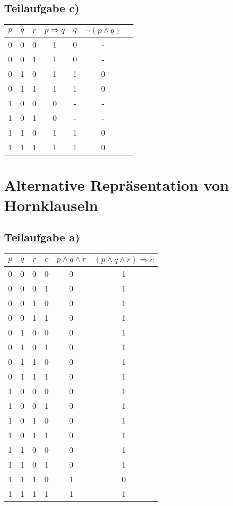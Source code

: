 \documentclass{article}
\begin{document}
\subsection{Teilaufgabe c)}

\begin{tabular}{|c|c|c|c|c|c|c|}
\hline
$p$ & $q$ & $r$ & $p \Rightarrow q$ & $q$ & $\neg (p \wedge q)$\\
\hline
0 & 0 & 0 & 1 & 0 & - \\
0 & 0 & 1 & 1 & 0 & - \\
0 & 1 & 0 & 1 & 1 & 0 \\
0 & 1 & 1 & 1 & 1 & 0 \\
1 & 0 & 0 & 0 & - & - \\
1 & 0 & 1 & 0 & - & - \\
1 & 1 & 0 & 1 & 1 & 0 \\
1 & 1 & 1 & 1 & 1 & 0 \\
\hline
\end{tabular}

\section{Alternative Repräsentation von Hornklauseln}

\subsection{Teilaufgabe a)}

\begin{tabular}{|c|c|c|c|c|c|}
\hline
$p$ & $q$ & $r$ & $c$ & $p \wedge q \wedge r$ & $(p \wedge q \wedge r) \Rightarrow c$\\
\hline
0 & 0 & 0 & 0 & 0 & 1\\
0 & 0 & 0 & 1 & 0 & 1\\
0 & 0 & 1 & 0 & 0 & 1\\
0 & 0 & 1 & 1 & 0 & 1\\
0 & 1 & 0 & 0 & 0 & 1\\
0 & 1 & 0 & 1 & 0 & 1\\
0 & 1 & 1 & 0 & 0 & 1\\
0 & 1 & 1 & 1 & 0 & 1\\
1 & 0 & 0 & 0 & 0 & 1\\
1 & 0 & 0 & 1 & 0 & 1\\
1 & 0 & 1 & 0 & 0 & 1\\
1 & 0 & 1 & 1 & 0 & 1\\
1 & 1 & 0 & 0 & 0 & 1\\
1 & 1 & 0 & 1 & 0 & 1\\
1 & 1 & 1 & 0 & 1 & 0\\
1 & 1 & 1 & 1 & 1 & 1\\
\hline
\end{tabular}
\end{document}
